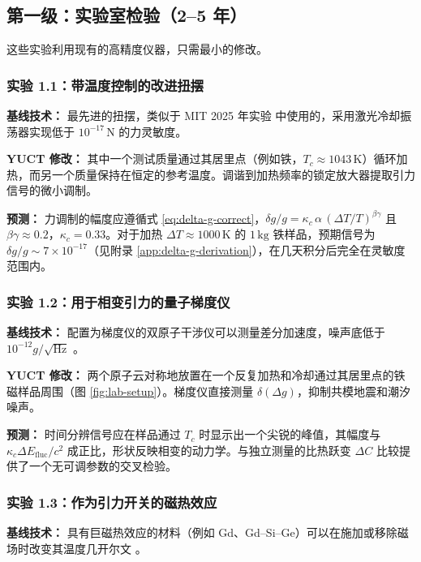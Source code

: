 \documentclass[12pt]{article}
\theoremstyle{remark}
\begin{document}
	\subsection{第一级：实验室检验（2–5 年）}
	\label{subsec:lab-tests}
	
	这些实验利用现有的高精度仪器，只需最小的修改。
	
	\subsubsection{实验 1.1：带温度控制的改进扭摆}
	
	\textbf{基线技术：} 最先进的扭摆，类似于 MIT 2025 年实验 \cite{MIT2025} 中使用的，采用激光冷却振荡器实现低于 $10^{-17}\,\mathrm{N}$ 的力灵敏度。
	
	\textbf{YUCT 修改：} 其中一个测试质量通过其居里点（例如铁，$T_c\approx1043\,\mathrm{K}$）循环加热，而另一个质量保持在恒定的参考温度。调谐到加热频率的锁定放大器提取引力信号的微小调制。
	
	\textbf{预测：} 力调制的幅度应遵循式 \ref{eq:delta-g-correct}，$\delta g/g = \kappa_c\,\alpha\,(\Delta T/T)^{\beta\gamma}$ 且 $\beta\gamma\approx0.2$，$\kappa_c=0.33$。对于加热 $\Delta T\approx1000\,\mathrm{K}$ 的 $1\,\mathrm{kg}$ 铁样品，预期信号为 $\delta g/g \sim 7\times10^{-17}$（见附录 \ref{app:delta-g-derivation}），在几天积分后完全在灵敏度范围内。
	
	\subsubsection{实验 1.2：用于相变引力的量子梯度仪}
	
	\textbf{基线技术：} 配置为梯度仪的双原子干涉仪可以测量差分加速度，噪声底低于 $10^{-12}g/\sqrt{\mathrm{Hz}}$ \cite{Snadden1998}。
	
	\textbf{YUCT 修改：} 两个原子云对称地放置在一个反复加热和冷却通过其居里点的铁磁样品周围（图 \ref{fig:lab-setup}）。梯度仪直接测量 $\delta(\Delta g)$，抑制共模地震和潮汐噪声。
	
	\textbf{预测：} 时间分辨信号应在样品通过 $T_c$ 时显示出一个尖锐的峰值，其幅度与 $\kappa_c \Delta E_{\mathrm{fluc}}/c^2$ 成正比，形状反映相变的动力学。与独立测量的比热跃变 $\Delta C$ 比较提供了一个无可调参数的交叉检验。
	
	\subsubsection{实验 1.3：作为引力开关的磁热效应}
	
	\textbf{基线技术：} 具有巨磁热效应的材料（例如 Gd、Gd–Si–Ge）可以在施加或移除磁场时改变其温度几开尔文 \cite{Gschneidner1999}。
	
\end{document}
